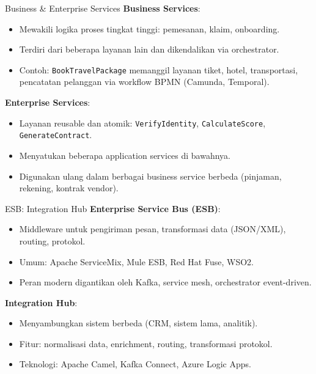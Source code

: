 \documentclass[aspectratio=169, table]{beamer}
\begin{document}
\begin{frame}[fragile]{Business \& Enterprise Services}
	\textbf{Business Services}:
	\begin{itemize}
		\item Mewakili logika proses tingkat tinggi: pemesanan, klaim, onboarding.
		\item Terdiri dari beberapa layanan lain dan dikendalikan via orchestrator.
		\item Contoh: \texttt{BookTravelPackage} memanggil layanan tiket, hotel, transportasi, pencatatan pelanggan via workflow BPMN (Camunda, Temporal).
	\end{itemize}
	
	\vspace{4pt}
	\textbf{Enterprise Services}:
	\begin{itemize}
		\item Layanan reusable dan atomik: \texttt{VerifyIdentity}, \texttt{CalculateScore}, \texttt{GenerateContract}.
		\item Menyatukan beberapa application services di bawahnya.
		\item Digunakan ulang dalam berbagai business service berbeda (pinjaman, rekening, kontrak vendor).
	\end{itemize}
\end{frame}

\begin{frame}[fragile]{ESB: Integration Hub}
	\textbf{Enterprise Service Bus (ESB)}:
	\begin{itemize}
		\item Middleware untuk pengiriman pesan, transformasi data (JSON/XML), routing, protokol.
		\item Umum: Apache ServiceMix, Mule ESB, Red Hat Fuse, WSO2.
		\item Peran modern digantikan oleh Kafka, service mesh, orchestrator event-driven.
	\end{itemize}
	
	\vspace{4pt}
	\textbf{Integration Hub}:
	\begin{itemize}
		\item Menyambungkan sistem berbeda (CRM, sistem lama, analitik).
		\item Fitur: normalisasi data, enrichment, routing, transformasi protokol.
		\item Teknologi: Apache Camel, Kafka Connect, Azure Logic Apps.
	\end{itemize}
\end{frame}
\end{document}
